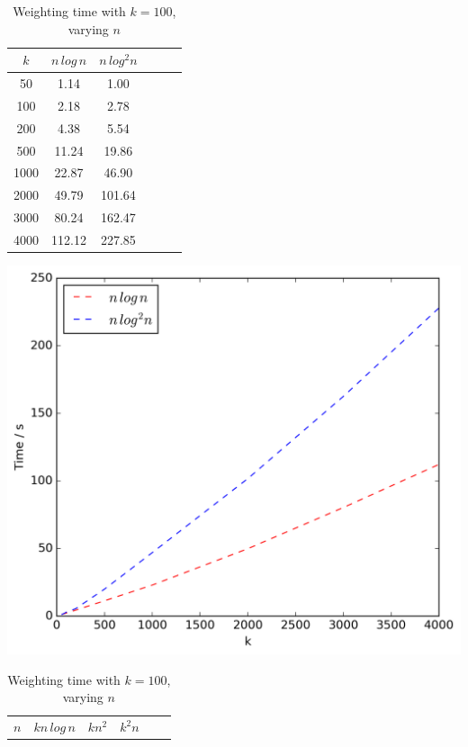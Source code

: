 \documentclass[final,1p,times]{elsarticle}
\begin{document}
\begin{table}[!ht]
\begin{minipage}{0.48\textwidth}
            \centering
            \caption{\texttt{Filter\_Clusters} time with $n = 1000$, varying $k$}
            \label{tab:filterk2}
            \begin{tabular}{c||ccccc}
                $k$ & $n\,log\,n$ & $n\,log^2n$\\
                \hline\hline
                50 & 1.14 & 1.00\\
                100 & 2.18 & 2.78\\
                200 & 4.38 & 5.54\\
                500 & 11.24 & 19.86\\
                1000 & 22.87 & 46.90\\
                2000 & 49.79 & 101.64\\
                3000 & 80.24 & 162.47\\
                4000 & 112.12 & 227.85\\
            \end{tabular}
            \includegraphics[scale=0.4]{varyingk2_filter}
            \vspace{0.5cm}
        \end{minipage}
        \begin{minipage}{0.48\textwidth}
            \centering
            \caption{Weighting time with $k = 100$, varying $n$}
            \label{tab:weightn2}
            \begin{tabular}{c||ccccc}
                $n$ & $kn\,log\,n$ & $kn^2$ & $k^2n$\\

\end{tabular}
\end{minipage}
\end{table}
\end{document}
